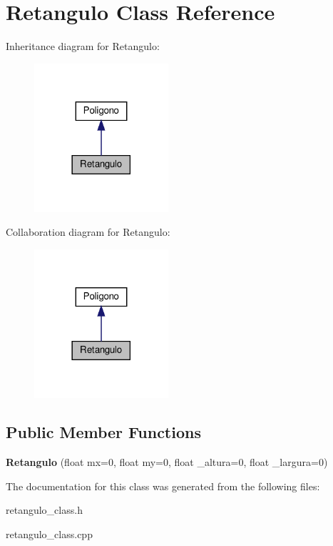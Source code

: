 \hypertarget{classRetangulo}{}\section{Retangulo Class Reference}
\label{classRetangulo}


Inheritance diagram for Retangulo\+:\nopagebreak
\begin{figure}[H]
\begin{center}
\leavevmode
\includegraphics[width=141pt]{classRetangulo__inherit__graph}
\end{center}
\end{figure}


Collaboration diagram for Retangulo\+:\nopagebreak
\begin{figure}[H]
\begin{center}
\leavevmode
\includegraphics[width=141pt]{classRetangulo__coll__graph}
\end{center}
\end{figure}
\subsection*{Public Member Functions}
\begin{DoxyCompactItemize}
\item 
\mbox{\label{classRetangulo_a563778613d1b13d6d3056aca22ab22cd}} 
{\bfseries Retangulo} (float mx=0, float my=0, float \+\_\+altura=0, float \+\_\+largura=0)
\end{DoxyCompactItemize}


The documentation for this class was generated from the following files\+:\begin{DoxyCompactItemize}
\item 
retangulo\+\_\+class.\+h\item 
retangulo\+\_\+class.\+cpp\end{DoxyCompactItemize}
